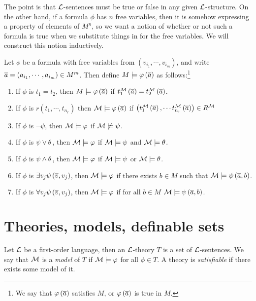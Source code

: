 \documentclass{amsart}
\begin{document}
The point is that $\mathcal{L}$-sentences must be true or false in any given $\mathcal{L}$-structure.
On the other hand, if a formula $\phi$ has $n$ free variables, then
it is somehow expressing a property of elements of $M^n$, so we want a notion of 
whether or not such a formula is true when we substitute things in for the free variables.
We will construct this notion inductively.

\begin{defn}
Let $\phi$ be a formula with free variables from $\left( v_{i_1} , \cdots , v_{i_m} \right)$,
and write $\overline{a} = \left( a_{i_1} , \cdots , a_{i_m} \right)\in M^m$. 
Then define $M\models \varphi\left( \overline{a} \right)$ as follows:\footnote{We 
say that $\varphi\left( \overline{a} \right)$ satisfies $M$, or $\varphi\left( \overline{a} \right)$ 
is true in $M$.}
\begin{enumerate}
\item If $\phi$ is $t_1 = t_2$, then $M\models \varphi\left( \overline{a} \right)$ if
$t_1^{\mathcal{M}} \left( \overline{a} \right) = t_2^{\mathcal{M}} \left( \overline{a} \right)$.
\item If $\phi$ is $r\left( t_{1} , \cdots , t_{n_r} \right)$ then
$\mathcal{M} \models \varphi\left( \overline{a} \right)$ if 
$\left( t_1^{\mathcal{M}}\left( \overline{a} \right) , \cdots t_{n_r}^{\mathcal{M}}\left( \overline{a} \right) \right)
\in R^{\mathcal{M}}$
\item If $\phi$ is $\neg \psi$, then $\mathcal{M} \models \varphi$ if
$\mathcal{M} \not \models \psi$.
\item If $\phi$ is $\psi \vee \theta$, then $\mathcal{M} \models \varphi$ if
$\mathcal{M} \models \psi$ and $\mathcal{M} \models \theta$.
\item If $\phi$ is $\psi \wedge \theta$, then $\mathcal{M} \models \varphi$ if
$\mathcal{M} \models \psi$ or $\mathcal{M} \models \theta$.
\item If $\phi$ is $\exists v_j \psi\left( \overline{v} , v_j \right)$,
then $\mathcal{M} \models \varphi$ if there exists $b\in M$ such that
$\mathcal{M} \models \psi\left( \overline{a}, b \right)$. 
\item If $\phi$ is $\forall v_j \psi\left( \overline{v} , v_j \right)$, 
then $\mathcal{M} \models \varphi$ if for all $b\in M$
$\mathcal{M} \models \psi\left( \overline{a} , b \right)$.
\end{enumerate}
\end{defn}

\section{Theories, models, definable sets}

\begin{defn}
Let $\mathcal{L}$ be a first-order language, then an $\mathcal{L}$-theory $T$ is a set of $\mathcal{L}$-sentences.
We say that $\mathcal{M}$ is a \emph{model} of $T$ if $\mathcal{M} \models \varphi$ for all $\phi \in T$.
A theory is \emph{satisfiable} if there exists some model of it.
\end{defn}
\end{document}
